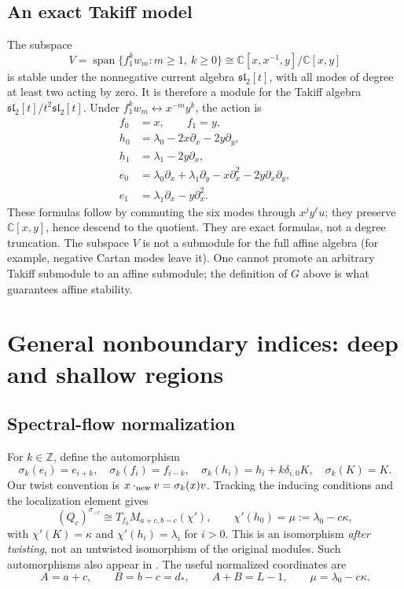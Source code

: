 \documentclass[11pt,a4paper]{article}
\newcommand{\C}{\mathbb C}
\newcommand{\Z}{\mathbb Z}
\newcommand{\slc}{\mathfrak{sl}_2}
\newcommand{\Span}{\operatorname{span}}
\theoremstyle{plainupright}
\begin{document}
\subsection{An exact Takiff model}

The subspace
\[
V=\Span\{f_1^kw_m:m\ge1,\ k\ge0\}
\cong \C[x,x^{-1},y]/\C[x,y]
\]
is stable under the nonnegative current algebra \(\slc[t]\), with all
modes of degree at least two acting by zero. It is therefore a module
for the Takiff algebra \(\slc[t]/t^2\slc[t]\).
Under \(f_1^kw_m\leftrightarrow x^{-m}y^k\), the action is
\begin{align*}
f_0&=x,\qquad f_1=y,\\
h_0&=\lambda_0-2x\partial_x-2y\partial_y,\\
h_1&=\lambda_1-2y\partial_x,\\
e_0&=\lambda_0\partial_x+\lambda_1\partial_y
      -x\partial_x^2-2y\partial_x\partial_y,\\
e_1&=\lambda_1\partial_x-y\partial_x^2.
\end{align*}
These formulas follow by commuting the six modes through \(x^jy^\ell u\);
they preserve \(\C[x,y]\), hence descend to the quotient.
They are exact formulas, not a degree truncation.
The subspace \(V\) is not a submodule for the full affine algebra
(for example, negative Cartan modes leave it).
One cannot promote an arbitrary Takiff submodule to an affine submodule;
the definition of \(G\) above is what guarantees affine stability.

\section{General nonboundary indices: deep and shallow regions}

\subsection{Spectral-flow normalization}

For \(k\in\Z\), define the automorphism
\[
\sigma_k(e_i)=e_{i+k},\quad
\sigma_k(f_i)=f_{i-k},\quad
\sigma_k(h_i)=h_i+k\delta_{i,0}K,\quad
\sigma_k(K)=K.
\]
Our twist convention is \(x\cdot_{\rm new}v=\sigma_k(x)v\).
Tracking the inducing conditions and the localization element gives
\begin{equation}\label{eq:spectral}
(Q_c)^{\sigma_{-c}}\cong
T_{f_0}M_{a+c,b-c}(\chi'),
\qquad
\chi'(h_0)=\mu:=\lambda_0-c\kappa,
\end{equation}
with \(\chi'(K)=\kappa\) and \(\chi'(h_i)=\lambda_i\) for \(i>0\).
This is an isomorphism \emph{after twisting}, not an untwisted
isomorphism of the original modules.
Such automorphisms also appear in \cite[Section 3.1]{FGXZ}.
The useful normalized coordinates are
\[
A=a+c,\qquad B=b-c=d_*,\qquad A+B=L-1,\qquad \mu=\lambda_0-c\kappa.
\]
\end{document}

